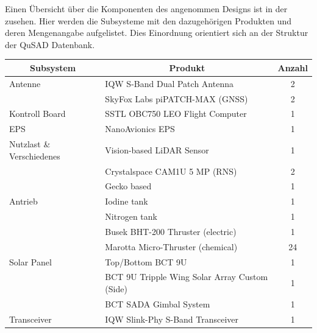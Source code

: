 				Einen Übersicht über die Komponenten des angenommen Designs ist in der  zusehen. Hier werden die Subsysteme mit den dazugehörigen Produkten und deren Mengenangabe aufgelistet. Dies Einordnung orientiert sich an der Struktur der QuSAD Datenbank.
				\begin{table}[H]
				\centering
\begin{tabular}{|l|l|c|}
\hline
\multicolumn{1}{|c|}{Subsystem} & \multicolumn{1}{c|}{Produkt}    	            & Anzahl \\ \hline
Antenne                         & IQW S-Band Dual Patch Antenna                 & 2      \\ \hline
                                & SkyFox Labs piPATCH-MAX (GNSS)                & 2      \\ \hline
Kontroll Board                  & SSTL OBC750 LEO Flight Computer               & 1      \\ \hline
EPS                             & NanoAvionics EPS                              & 1      \\ \hline
Nutzlast \& Verschiedenes       & Vision-based LiDAR Sensor                     & 1      \\ \hline
                                & Crystalspace CAM1U 5 MP (RNS)                 & 2      \\ \hline
                                & Gecko based                                   & 1      \\ \hline
Antrieb                         & Iodine tank                                   & 1      \\ \hline
                                & Nitrogen tank                                 & 1      \\ \hline
                                & Busek BHT-200 Thruster (electric)             & 1      \\ \hline
                                & Marotta Micro-Thruster (chemical)             & 24     \\ \hline
Solar Panel                     & Top/Bottom BCT 9U                             & 1      \\ \hline
                                & BCT 9U Tripple Wing Solar Array Custom (Side) & 1      \\ \hline
                                & BCT SADA Gimbal System                        & 1      \\ \hline
Transceiver                     & IQW Slink-Phy S-Band Transceiver              & 1      \\ \hline

\end{tabular}
\end{table}
